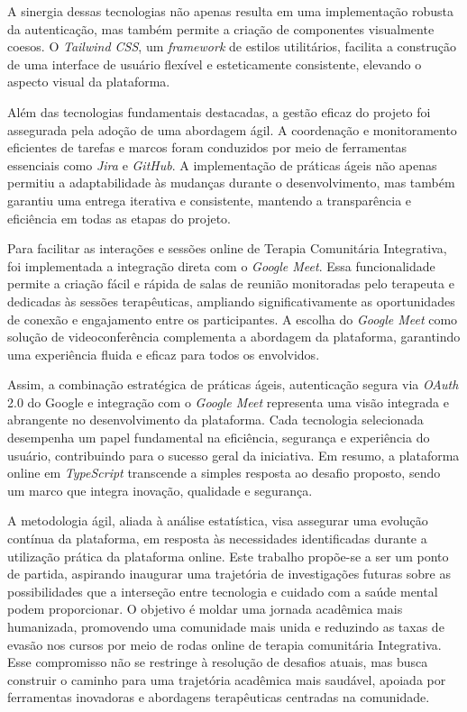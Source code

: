 A sinergia dessas tecnologias não apenas resulta em uma implementação robusta da autenticação, mas também permite a criação de componentes visualmente coesos. O \textit{Tailwind CSS}, um \textit{framework} de estilos utilitários, facilita a construção de uma interface de usuário flexível e esteticamente consistente, elevando o aspecto visual da plataforma.

Além das tecnologias fundamentais destacadas, a gestão eficaz do projeto foi assegurada pela adoção de uma abordagem ágil. A coordenação e monitoramento eficientes de tarefas e marcos foram conduzidos por meio de ferramentas essenciais como \textit{Jira} e \textit{GitHub}. A implementação de práticas ágeis não apenas permitiu a adaptabilidade às mudanças durante o desenvolvimento, mas também garantiu uma entrega iterativa e consistente, mantendo a transparência e eficiência em todas as etapas do projeto.

Para facilitar as interações e sessões online de Terapia Comunitária Integrativa, foi implementada a integração direta com o \textit{Google Meet}. Essa funcionalidade permite a criação fácil e rápida de salas de reunião monitoradas pelo terapeuta e dedicadas às sessões terapêuticas, ampliando significativamente as oportunidades de conexão e engajamento entre os participantes. A escolha do \textit{Google Meet} como solução de videoconferência complementa a abordagem da plataforma, garantindo uma experiência fluida e eficaz para todos os envolvidos.

Assim, a combinação estratégica de práticas ágeis, autenticação segura via \textit{OAuth} 2.0 do Google e integração com o \textit{Google Meet} representa uma visão integrada e abrangente no desenvolvimento da plataforma. Cada tecnologia selecionada desempenha um papel fundamental na eficiência, segurança e experiência do usuário, contribuindo para o sucesso geral da iniciativa. Em resumo, a plataforma online em \textit{TypeScript} transcende a simples resposta ao desafio proposto, sendo um marco que integra inovação, qualidade e segurança.

A metodologia ágil, aliada à análise estatística, visa assegurar uma evolução contínua da plataforma, em resposta às necessidades identificadas durante a utilização prática da plataforma online. Este trabalho propõe-se a ser um ponto de partida, aspirando inaugurar uma trajetória de investigações futuras sobre as possibilidades que a  interseção entre tecnologia e cuidado com a saúde mental podem proporcionar. O objetivo é moldar uma jornada acadêmica mais humanizada, promovendo uma comunidade mais unida e reduzindo as taxas de evasão nos cursos por meio de rodas online de terapia comunitária Integrativa. Esse compromisso não se restringe à resolução de desafios atuais, mas busca construir o caminho para uma trajetória acadêmica mais saudável, apoiada por ferramentas inovadoras e abordagens terapêuticas centradas na comunidade.



